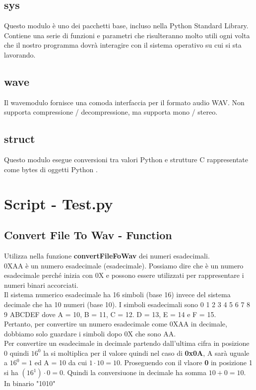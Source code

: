 \documentclass{article}
\begin{document}
\subsection{sys}
Questo modulo è uno dei pacchetti base, incluso nella Python Standard Library. Contiene una serie di funzioni e parametri che risulteranno molto utili ogni volta che il nostro programma dovrà interagire con il sistema operativo su cui si sta lavorando.
\subsection{wave}
Il wavemodulo fornisce una comoda interfaccia per il formato audio WAV. Non supporta compressione / decompressione, ma supporta mono / stereo. 
\subsection{struct}
Questo modulo esegue conversioni tra valori Python e strutture C rappresentate come bytes di oggetti Python .
\section{Script - Test.py}
\subsection{Convert File To Wav - Function}
Utilizza nella funzione \textbf{convertFileFoWav} dei numeri esadecimali. 
\\0XAA è un numero esadecimale (esadecimale). Possiamo dire che è un numero esadecimale perché inizia con 0X e possono essere utilizzati per rappresentare i numeri binari accorciati. 
\\Il sistema numerico esadecimale ha 16 simboli (base 16) invece del sistema decimale che ha 10 numeri (base 10). I simboli esadecimali sono 0 1 2 3 4 5 6 7 8 9 ABCDEF dove A = 10, B = 11, C = 12. D = 13, E = 14 e F = 15.
\\Pertanto, per convertire un numero esadecimale come 0XAA in decimale, dobbiamo solo guardare i simboli dopo 0X che sono AA.
\\Per convertire un esadecimale in decimale partendo dall'ultima cifra in posizione 0 quindi $ 16^{0} $ la si moltiplica per il valore quindi nel caso di \textbf{0x0A}, A sarà uguale a $ 16^{0} = 1 $ ed A = 10 da cui $1 \cdot 10 = 10$. Proseguendo con il vlaore \textbf{0} in posizione 1 si ha $(16^{1})\cdot0 = 0$. Quindi la conversiuone in decimale ha somma $10 + 0 = 10$. In binario "1010"
\end{document}
